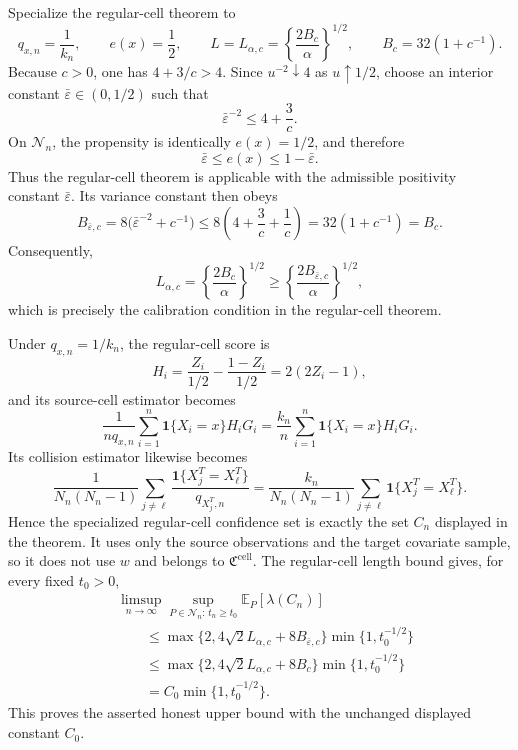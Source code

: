 Specialize the regular-cell theorem to
\[
q_{x,n}=\frac{1}{k_n},
\qquad e(x)=\frac12,
\qquad L=L_{\alpha,c}=\left\{\frac{2B_c}{\alpha}\right\}^{1/2},
\qquad B_c=32(1+c^{-1}).
\]
Because \(c>0\), one has \(4+3/c>4\).  Since \(u^{-2}\downarrow4\) as \(u\uparrow1/2\), choose an interior constant \(\bar\varepsilon\in(0,1/2)\) such that
\[
\bar\varepsilon^{-2}\le 4+\frac3c.
\]
On \(\mathcal N_n\), the propensity is identically \(e(x)=1/2\), and therefore
\[
\bar\varepsilon\le e(x)\le1-\bar\varepsilon.
\]
Thus the regular-cell theorem is applicable with the admissible positivity constant \(\bar\varepsilon\).  Its variance constant then obeys
\[
B_{\bar\varepsilon,c}
=8\bigl(\bar\varepsilon^{-2}+c^{-1}\bigr)
\le8\left(4+\frac3c+\frac1c\right)
=32(1+c^{-1})
=B_c.
\]
Consequently,
\[
L_{\alpha,c}=\left\{\frac{2B_c}{\alpha}\right\}^{1/2}
\ge\left\{\frac{2B_{\bar\varepsilon,c}}{\alpha}\right\}^{1/2},
\]
which is precisely the calibration condition in the regular-cell theorem.

Under \(q_{x,n}=1/k_n\), the regular-cell score is
\[
H_i=\frac{Z_i}{1/2}-\frac{1-Z_i}{1/2}=2(2Z_i-1),
\]
and its source-cell estimator becomes
\[
\frac1{nq_{x,n}}\sum_{i=1}^n\mathbf 1\{X_i=x\}H_iG_i
=\frac{k_n}{n}\sum_{i=1}^n\mathbf 1\{X_i=x\}H_iG_i.
\]
Its collision estimator likewise becomes
\[
\frac1{N_n(N_n-1)}\sum_{j\ne\ell}
\frac{\mathbf 1\{X_j^T=X_\ell^T\}}{q_{X_j^T,n}}
=\frac{k_n}{N_n(N_n-1)}\sum_{j\ne\ell}
\mathbf 1\{X_j^T=X_\ell^T\}.
\]
Hence the specialized regular-cell confidence set is exactly the set \(C_n\) displayed in the theorem.  It uses only the source observations and the target covariate sample, so it does not use \(w\) and belongs to \(\mathfrak C^{\mathrm{cell}}\).  The regular-cell length bound gives, for every fixed \(t_0>0\),
\[
\begin{aligned}
&\limsup_{n\to\infty}
\sup_{P\in\mathcal N_n:\,t_n\ge t_0}
\mathbb E_P[\lambda(C_n)]\\
&\qquad\le
\max\{2,4\sqrt2L_{\alpha,c}+8B_{\bar\varepsilon,c}\}
\min\{1,t_0^{-1/2}\}\\
&\qquad\le
\max\{2,4\sqrt2L_{\alpha,c}+8B_c\}
\min\{1,t_0^{-1/2}\}\\
&\qquad=C_0\min\{1,t_0^{-1/2}\}.
\end{aligned}
\]
This proves the asserted honest upper bound with the unchanged displayed constant \(C_0\).

